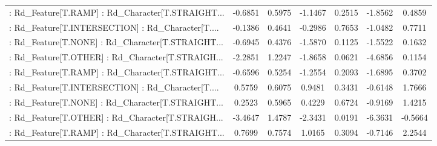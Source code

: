 \begin{longtable}{p{4cm}cccccc}
 : Rd\_Feature[T.RAMP] : Rd\_Character[T.STRAIGHT... & -0.6851 &    0.5975 & -1.1467 &       0.2515 & -1.8562 &  0.4859 \\
 : Rd\_Feature[T.INTERSECTION] : Rd\_Character[T.... & -0.1386 &    0.4641 & -0.2986 &       0.7653 & -1.0482 &  0.7711 \\
 : Rd\_Feature[T.NONE] : Rd\_Character[T.STRAIGHT... & -0.6945 &    0.4376 & -1.5870 &       0.1125 & -1.5522 &  0.1632 \\
 : Rd\_Feature[T.OTHER] : Rd\_Character[T.STRAIGH... & -2.2851 &    1.2247 & -1.8658 &       0.0621 & -4.6856 &  0.1154 \\
 : Rd\_Feature[T.RAMP] : Rd\_Character[T.STRAIGHT... & -0.6596 &    0.5254 & -1.2554 &       0.2093 & -1.6895 &  0.3702 \\
 : Rd\_Feature[T.INTERSECTION] : Rd\_Character[T.... &  0.5759 &    0.6075 &  0.9481 &       0.3431 & -0.6148 &  1.7666 \\
 : Rd\_Feature[T.NONE] : Rd\_Character[T.STRAIGHT... &  0.2523 &    0.5965 &  0.4229 &       0.6724 & -0.9169 &  1.4215 \\
 : Rd\_Feature[T.OTHER] : Rd\_Character[T.STRAIGH... & -3.4647 &    1.4787 & -2.3431 &       0.0191 & -6.3631 & -0.5664 \\
 : Rd\_Feature[T.RAMP] : Rd\_Character[T.STRAIGHT... &  0.7699 &    0.7574 &  1.0165 &       0.3094 & -0.7146 &  2.2544 \\
\end{longtable}
